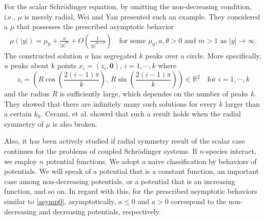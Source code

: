 \documentclass{amsart}
\theoremstyle{definition}
\theoremstyle{remark}
\numberwithin{equation}{section}
\begin{document}
For the scalar Schr\"odinger equation, by omitting the non-decreasing condition, i.e., $\mu$ is merely radial, Wei and Yan \cite{wei_yan_2014} presented such an example. They considered a $\mu$ that possesses the prescribed asymptotic behavior
\begin{align} \label{asymp0}
 \mu(|y|) = \mu_0 + \frac{a}{|y|^m} + {O}\left(\frac{1}{|y|^{m+\theta}}\right) \quad \text{for some $\mu_0,a,\theta>0$ and $m>1$ as $|y| \rightarrow \infty$}.
\end{align}
The constructed solution $u$ has segregated $k$ peaks over a circle. More specifically, $u$ peaks about $k$ points $x_i=(z_i,\mathbf{0})$, $i=1,\cdots,k$ where
$$z_i= \left( R \cos\left(\frac{2(i-1)\pi}{k}\right), ~R \sin\left(\frac{2(i-1)\pi}{k}\right)\right)\in \mathbb{R}^2 \quad \text{for $i=1,\cdots,k$}$$
and the radius $R$ is sufficiently large, which dependes on the number of peaks $k$. They showed that there are infinitely many such solutions for every $k$ larger than a certain $k_0$. Cerami, et al. \cite{cerami_passaseo_solimini_2015} showed that such a result holds when the radial symmetry of $\mu$ is also broken. 

Also, it has been actively studied if radial symmetry result of the scalar case continues for the problems of coupled Schr\"odinger systems. If $n$-species interact, we employ $n$ potential functions. We adopt a naive classification by behaviors of potentials. We will speak of a potential that is a constant function, an important case among non-decreasing potentials, or a potential that is an increasing function, and so on. In regard with this, for the prescribed asymptotic behaviors similar to \eqref{asymp0},  asymptotically, $a\le 0$ and  $a>0$ correspond to the non-decreasing and decreasing potentials, respectively.
\end{document}
